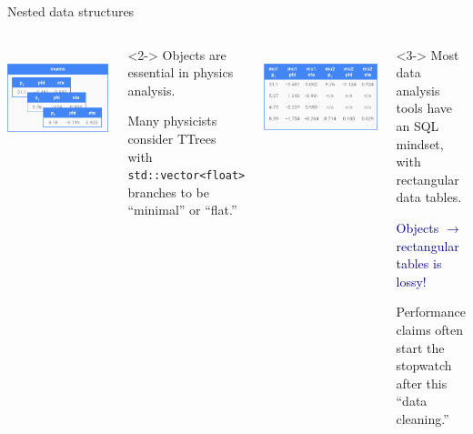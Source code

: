 \documentclass[aspectratio=169]{beamer}
\begin{document}
\begin{frame}{Nested data structures}
\large
\vspace{0.5 cm}
\begin{columns}[t]
\mbox{ } \hfill \includegraphics[width=0.75\linewidth]{muons-as-objects.png} \hfill \mbox{ }

\vspace{0.25 cm}
\begin{uncoverenv}<2->
Objects are essential in physics analysis.

\vspace{0.25 cm}
Many physicists consider TTrees with {\tt\small std::vector<float>} branches to be ``minimal'' or ``flat.''
\end{uncoverenv}

\mbox{ } \hfill \includegraphics[width=0.75\linewidth]{muons-as-a-table.png} \hfill \mbox{ }

\vspace{0.25 cm}
\begin{uncoverenv}<3->
Most data analysis tools have an SQL mindset, with rectangular data tables.

\vspace{0.25 cm}
\textcolor{darkblue}{Objects $\to$ rectangular tables is lossy!}

\vspace{0.25 cm}
Performance claims often start the stopwatch after this ``data cleaning.''
\end{uncoverenv}
\end{columns}
\end{frame}
\end{document}
